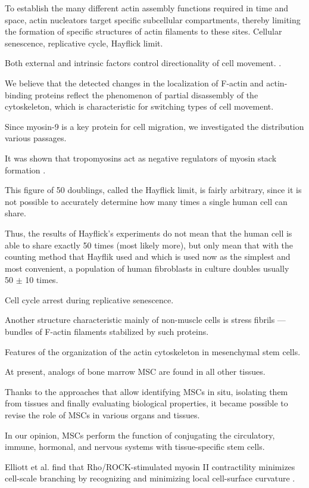 \documentclass[english,authoryear]{elsarticle}
\begin{document}
To establish the many different actin assembly functions required in time and space, actin nucleators target specific subcellular compartments, thereby limiting the formation of specific structures of actin filaments to these sites.
Cellular senescence, replicative cycle, Hayflick limit.

Both external and intrinsic factors control directionality of cell movement. \cite{tiurin2013molecular}.

We believe that the detected changes in the localization of F-actin and actin-binding proteins reflect the phenomenon of partial disassembly of the cytoskeleton, which is characteristic for switching types of cell movement.

Since myosin-9 is a key protein for cell migration, we investigated the distribution various passages.

It was shown that tropomyosins act as negative regulators of myosin stack formation \cite{hu2019reciprocal}.

This figure of 50 doublings, called the Hayflick limit, is fairly arbitrary, since it is not possible to accurately determine how many times a single human cell can share.

Thus, the results of Hayflick's experiments do not mean that the human cell is able to share exactly 50 times (most likely more), but only mean that with the counting method that Hayflik used and which is used now as the simplest and most convenient, a population of human fibroblasts in culture doubles usually ~ 50 $\pm$ 10 times.

Cell cycle arrest during replicative senescence.

Another structure characteristic mainly of non-muscle cells is stress fibrils — bundles of F-actin filaments stabilized by such proteins.

Features of the organization of the actin cytoskeleton in mesenchymal stem cells.

At present, analogs of bone marrow MSC are found in all other tissues.

Thanks to the approaches that allow identifying MSCs in situ, isolating them from tissues and finally evaluating biological properties, it became possible to revise the role of MSCs in various organs and tissues.

In our opinion, MSCs perform the function of conjugating the circulatory, immune, hormonal, and nervous systems with tissue-specific stem cells.


Elliott et al. find that Rho/ROCK-stimulated myosin II contractility minimizes cell-scale branching by recognizing and minimizing local cell-surface curvature \cite{elliott2015myosin}.
\end{document}
